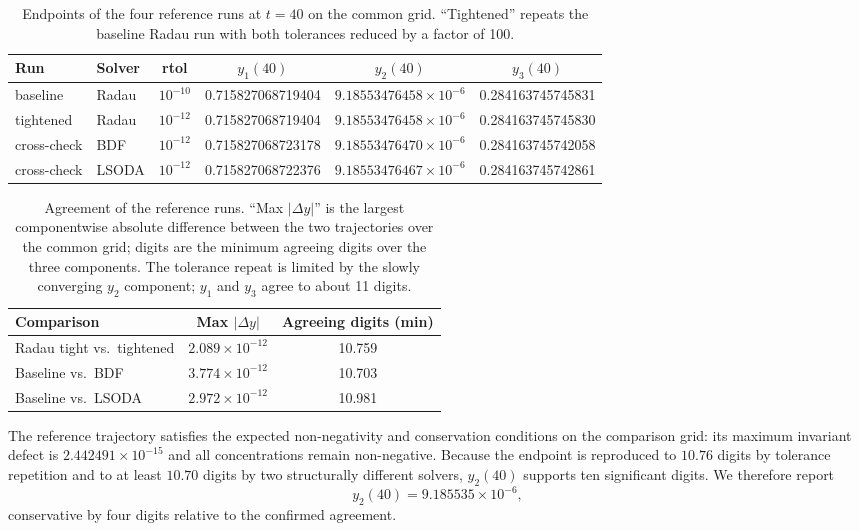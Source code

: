 \begin{table}[H]
\centering
\small
\caption{Endpoints of the four reference runs at $t=40$ on the common grid. ``Tightened'' repeats the baseline Radau run with both tolerances reduced by a factor of 100.}
\label{tab:ref-endpoints}
\begin{tabular}{llcccc}
\toprule
Run & Solver & rtol & $y_1(40)$ & $y_2(40)$ & $y_3(40)$\\
\midrule
baseline  & Radau & $10^{-10}$ & 0.715827068719404 & $9.18553476458\times10^{-6}$ & 0.284163745745831\\
tightened & Radau & $10^{-12}$ & 0.715827068719404 & $9.18553476458\times10^{-6}$ & 0.284163745745830\\
cross-check & BDF   & $10^{-12}$ & 0.715827068723178 & $9.18553476470\times10^{-6}$ & 0.284163745742058\\
cross-check & LSODA & $10^{-12}$ & 0.715827068722376 & $9.18553476467\times10^{-6}$ & 0.284163745742861\\
\bottomrule
\end{tabular}
\end{table}

\begin{table}[H]
\centering
\small
\caption{Agreement of the reference runs. ``Max $|\Delta y|$'' is the largest componentwise absolute difference between the two trajectories over the common grid; digits are the minimum agreeing digits over the three components. The tolerance repeat is limited by the slowly converging $y_2$ component; $y_1$ and $y_3$ agree to about 11 digits.}
\label{tab:ref-agreement}
\begin{tabular}{lcc}
\toprule
Comparison & Max $|\Delta y|$ & Agreeing digits (min)\\
\midrule
Radau tight vs.\ tightened & $2.089\times10^{-12}$ & 10.759\\
Baseline vs.\ BDF          & $3.774\times10^{-12}$ & 10.703\\
Baseline vs.\ LSODA        & $2.972\times10^{-12}$ & 10.981\\
\bottomrule
\end{tabular}
\end{table}

The reference trajectory satisfies the expected non-negativity and conservation conditions on the comparison grid: its maximum invariant defect is $2.442491\times10^{-15}$ and all concentrations remain non-negative. Because the endpoint is reproduced to $10.76$ digits by tolerance repetition and to at least $10.70$ digits by two structurally different solvers, $y_2(40)$ supports ten significant digits. We therefore report
\[
y_2(40)=9.185535\times10^{-6},
\]
conservative by four digits relative to the confirmed agreement.

